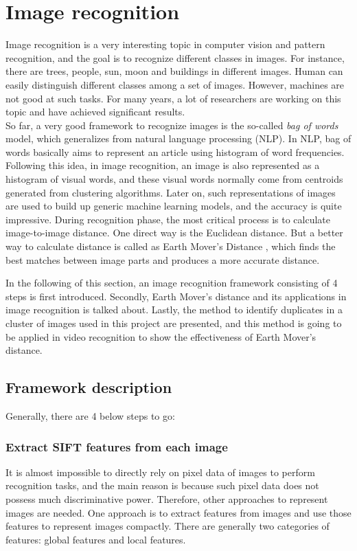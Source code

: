 \section {Image recognition}
Image recognition is a very interesting topic in computer vision and pattern recognition, and the goal is to recognize different classes in images. For instance, there are trees, people, sun, moon and buildings in different images. Human can easily distinguish different classes among a set of images. However, machines are not good at such tasks. For many years, a lot of researchers are working on this topic and have achieved significant results.\\

\noindent So far, a very good framework to recognize images is the so-called {\em bag of words} model, which generalizes from natural language processing (NLP). In NLP, bag of words basically aims to represent an article using histogram of word frequencies. Following this idea, in image recognition, an image is also represented as a histogram of visual words, and these visual words normally come from centroids generated from clustering algorithms. Later on, such representations of images are used to build up generic machine learning models, and the accuracy is quite impressive. During recognition phase, the most critical process is to calculate image-to-image distance. One direct way is the Euclidean distance. But a better way to calculate distance is called as Earth Mover's Distance \cite{rubner2000earth}, which finds the best matches between image parts and produces a more accurate distance.

\noindent In the following of this section, an image recognition framework consisting of 4 steps is first introduced. Secondly, Earth Mover's distance and its applications in image recognition is talked about. Lastly, the method to identify duplicates in a cluster of images used in this project are presented, and this method is going to be applied in video recognition to show the effectiveness of Earth Mover's distance.

\subsection{Framework description}

Generally, there are 4 below steps to go:

\subsubsection{Extract SIFT features from each image}
It is almost impossible to directly rely on pixel data of images to perform recognition tasks, and the main reason is because such pixel data does not possess much discriminative power. Therefore, other approaches to represent images are needed. One approach is to extract features from images and use those features to represent images compactly. There are generally two categories of features: global features and local features.

